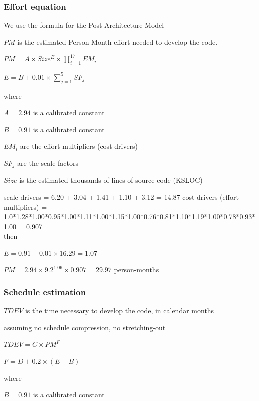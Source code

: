 \documentclass[english]{article}
\begin{document}
\subsubsection{Effort equation}

We use the formula for the Post-Architecture Model

$PM$ is the estimated Person-Month effort needed to develop the code.


\begin{center}
$ PM = A \times Size^E \times \prod_{i=1}^{17} EM_i $
\end{center}

\begin{center}
$ E = B + 0.01 \times \sum_{j=1}^{5} SF_j $
\end{center}
where

$ A = 2.94 $ is a calibrated constant 

$ B = 0.91 $ is a calibrated constant

$EM_i$ are the effort multipliers (cost drivers)

$SF_j$ are the scale factors

$Size$ is the estimated thousands of lines of source code (KSLOC)


scale drivers = 6.20 + 3.04 + 1.41 + 1.10 + 3.12 = 14.87
cost drivers (effort multipliers) = 1.0*1.28*1.00*0.95*1.00*1.11*1.00*1.15*1.00*0.76*0.81*1.10*1.19*1.00*0.78*0.93*1.00 = 0.907\\
then

$E = 0.91 + 0.01 \times 16.29 = 1.07$

$PM = 2.94 \times 9.2^{1.06} \times 0.907 = 29.97$ person-months

\subsubsection{Schedule estimation}

$TDEV$ is the time necessary to develop the code, in calendar months

assuming no schedule compression, no stretching-out

\begin{center}
	$TDEV = C \times PM^F$
\end{center}

\begin{center}
	$F = D + 0.2 \times (E-B)$
\end{center}
where

$B = 0.91$ is a calibrated constant
\end{document}
